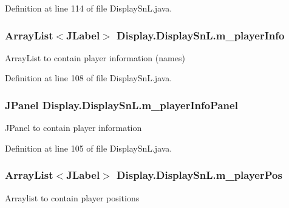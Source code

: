 Definition at line 114 of file Display\+Sn\+L.\+java.

\hypertarget{class_display_1_1_display_sn_l_ad4d75120b08606844b7fa63e2990928b}{}
\subsubsection[{m\+\_\+player\+Info}]{\setlength{\rightskip}{0pt plus 5cm}Array\+List$<$J\+Label$>$ Display.\+Display\+Sn\+L.\+m\+\_\+player\+Info\hspace{0.3cm}{\ttfamily [private]}}\label{class_display_1_1_display_sn_l_ad4d75120b08606844b7fa63e2990928b}
Array\+List to contain player information (names) 

Definition at line 108 of file Display\+Sn\+L.\+java.

\hypertarget{class_display_1_1_display_sn_l_a7afa5f7ca8e697b64de4de4246f2c2a8}{}
\subsubsection[{m\+\_\+player\+Info\+Panel}]{\setlength{\rightskip}{0pt plus 5cm}J\+Panel Display.\+Display\+Sn\+L.\+m\+\_\+player\+Info\+Panel\hspace{0.3cm}{\ttfamily [private]}}\label{class_display_1_1_display_sn_l_a7afa5f7ca8e697b64de4de4246f2c2a8}
J\+Panel to contain player information 

Definition at line 105 of file Display\+Sn\+L.\+java.

\hypertarget{class_display_1_1_display_sn_l_aa4b30638e1d8f99b5052652ea02d6365}{}
\subsubsection[{m\+\_\+player\+Pos}]{\setlength{\rightskip}{0pt plus 5cm}Array\+List$<$J\+Label$>$ Display.\+Display\+Sn\+L.\+m\+\_\+player\+Pos\hspace{0.3cm}{\ttfamily [private]}}\label{class_display_1_1_display_sn_l_aa4b30638e1d8f99b5052652ea02d6365}
Arraylist to contain player positions 

